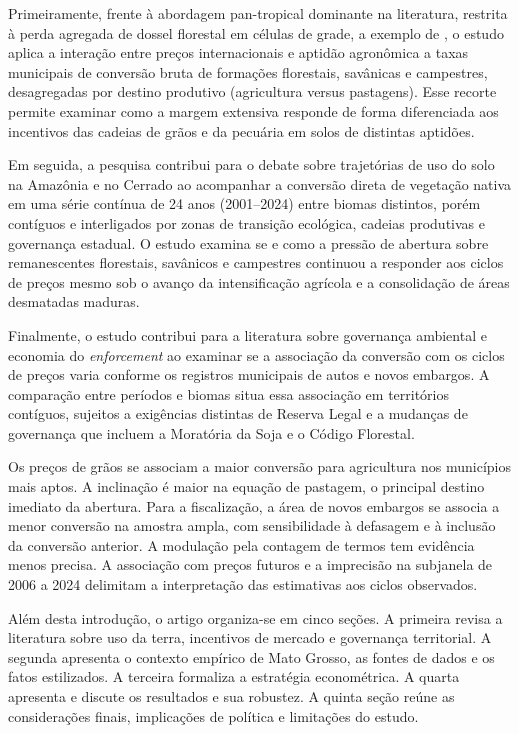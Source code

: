 Primeiramente, frente à abordagem pan-tropical dominante na literatura, restrita à perda agregada de dossel florestal em células de grade, a exemplo de , o estudo aplica a interação entre preços internacionais e aptidão agronômica a taxas municipais de conversão bruta de formações florestais, savânicas e campestres, desagregadas por destino produtivo (agricultura versus pastagens). Esse recorte permite examinar como a margem extensiva responde de forma diferenciada aos incentivos das cadeias de grãos e da pecuária em solos de distintas aptidões.

Em seguida, a pesquisa contribui para o debate sobre trajetórias de uso do solo na Amazônia e no Cerrado \cite{MacedoEtAl2012, Spera2017, Braganca2018, SimoesEtAl2020} ao acompanhar a conversão direta de vegetação nativa em uma série contínua de 24 anos (2001--2024) entre biomas distintos, porém contíguos e interligados por zonas de transição ecológica, cadeias produtivas e governança estadual. O estudo examina se e como a pressão de abertura sobre remanescentes florestais, savânicos e campestres continuou a responder aos ciclos de preços mesmo sob o avanço da intensificação agrícola e a consolidação de áreas desmatadas maduras.

Finalmente, o estudo contribui para a literatura sobre governança ambiental e economia do \textit{enforcement} \cite{Shimshack2014, AssuncaoEtAl2015, AssuncaoEtAl2023, HardingEtAl2021, HeilmayrEtAl2020} ao examinar se a associação da conversão com os ciclos de preços varia conforme os registros municipais de autos e novos embargos. A comparação entre períodos e biomas situa essa associação em territórios contíguos, sujeitos a exigências distintas de Reserva Legal e a mudanças de governança que incluem a Moratória da Soja e o Código Florestal.

Os preços de grãos se associam a maior conversão para agricultura nos municípios mais aptos. A inclinação é maior na equação de pastagem, o principal destino imediato da abertura. Para a fiscalização, a área de novos embargos se associa a menor conversão na amostra ampla, com sensibilidade à defasagem e à inclusão da conversão anterior. A modulação pela contagem de termos tem evidência menos precisa. A associação com preços futuros e a imprecisão na subjanela de 2006 a 2024 delimitam a interpretação das estimativas aos ciclos observados.

Além desta introdução, o artigo organiza-se em cinco seções. A primeira revisa a literatura sobre uso da terra, incentivos de mercado e governança territorial. A segunda apresenta o contexto empírico de Mato Grosso, as fontes de dados e os fatos estilizados. A terceira formaliza a estratégia econométrica. A quarta apresenta e discute os resultados e sua robustez. A quinta seção reúne as considerações finais, implicações de política e limitações do estudo.
